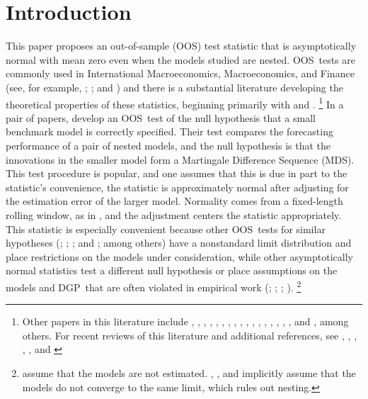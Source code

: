 \documentclass[12pt,fleqn]{article}
\theoremstyle{definition}
\newcommand{\dgp}{DGP}
\newcommand{\mds}{MDS}
\newcommand{\oos}{OOS}
\begin{document}
\newpage 

\section{Introduction} This paper proposes an out-of-sample (\oos)
test statistic that is asymptotically normal with mean zero even when
the models studied are nested.
\oos\ tests are commonly used in International Macroeconomics,
Macroeconomics, and Finance (see, for example, \citealt{MeR:83};
\citealt{StW:03}; and \citealt{GoW:08}) and there is a substantial
literature developing the theoretical properties of these statistics,
beginning primarily with \citet{DiM:95} and
\citet{Wes:96}.%
\footnote{Other papers in this literature include
  \citet{WeM:98}, \citet{Mcc:98,Mcc:00},
  \citet{ClM:01,ClM:05-2,ClM:05,ClM:11b,ClM:12,ClM:12b},
  \citet{CCS:01}, \citet{CoS:02,CoS:04,CoS:07}, \citet{Whi:00},
  \citet{InK:04,InK:06}, \citet{Han:05}, \citet{Ros:05},
  \citet{ClW:06,ClW:07}, \citet{Ana:07}, \citet{GiR:09,GiR:10},
  \citet{HuW:10}, \citet{HLN:11}, \cite{InR:11}, \cite{Pin:11},
  \cite{RoS:11,RoS:11b}, and \citet{Cal:11}, among others.  For recent
  reviews of this literature and additional references, see
  \citet{McW:02}, \citet{CoS:06}, \citet{Wes:06}, \citet{ClM:11c},
  \citet{CoD:11}, and \citet{Gia:11}} %
In a pair of papers,
\citet{ClW:06,ClW:07} develop an \oos\ test of the null hypothesis
that a small benchmark model is correctly specified.  Their test
compares the forecasting performance of a pair of nested models, and
the null hypothesis is that the innovations in the smaller model form
a Martingale Difference Sequence (\mds).  This test procedure is popular, and
one assumes that this is due in part to the statistic's convenience,
the statistic is approximately normal after adjusting for the
estimation error of the larger model.  Normality comes from a
fixed-length rolling window, as in \citet{GiW:06}, and the adjustment
centers the statistic appropriately.  This statistic is especially
convenient because other \oos\ tests for similar hypotheses
(\citealt{CCS:01}; \citealt{ClM:01,ClM:05}; \citealt{CoS:02,CoS:04};
and \citealt{Mcc:07}; among others) have a nonstandard limit
distribution and place restrictions on the models under consideration,
while other asymptotically normal statistics test a different null
hypothesis \citep{GiW:06} or place assumptions on the models and \dgp\
that are often violated in empirical work (\citealt{DiM:95};
\citealt{Wes:96}; \citealt{WeM:98};
\citealt{Mcc:00}).%
\footnote{\citet{DiM:95} assume that the models are
  not estimated. \citet{Wes:96}, \citet{WeM:98}, and \citet{Mcc:00}
  implicitly assume that the models do not converge to the same limit,
  which rules out nesting.} %
\end{document}
